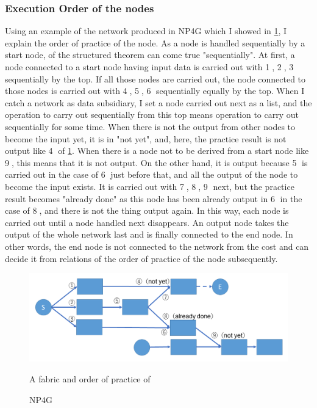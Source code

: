 \documentclass{article}
\begin{document}
\subsubsection {Execution Order of the nodes}
\label{sec:sequence}
Using an example of the network produced in NP4G which I showed in \ref{fig:sequence}, I explain the order of practice of the node.
As a node is handled sequentially by a start node, of the structured theorem can come true "sequentially".
At first, a node connected to a start node having input data is carried out with \textcircled{\scriptsize 1}, \textcircled{\scriptsize 2}, \textcircled{\scriptsize 3} sequentially by the top.
If all those nodes are carried out, the node connected to those nodes is carried out with \textcircled{\scriptsize 4}, \textcircled{\scriptsize 5}, \textcircled{\scriptsize 6} sequentially equally by the top.
When I catch a network as data subsidiary, I set a node carried out next as a list, and the operation to carry out sequentially from this top means operation to carry out sequentially for some time.
When there is not the output from other nodes to become the input yet, it is in "not yet", and, here, the practice result is not output like \textcircled{\scriptsize 4} of \ref{fig:sequence}.
When there is a node not to be derived from a start node like \textcircled{\scriptsize 9}, this means that it is not output.
On the other hand, it is output because \textcircled{\scriptsize 5} is carried out in the case of \textcircled{\scriptsize 6} just before that, and all the output of the node to become the input exists.
It is carried out with \textcircled{\scriptsize 7}, \textcircled{\scriptsize 8}, \textcircled{\scriptsize 9} next, but the practice result becomes "already done" as this node has been already output in \textcircled{\scriptsize 6} in the case of \textcircled{\scriptsize 8}, and there is not the thing output again.
In this way, each node is carried out until a node handled next disappears.
An output node takes the output of the whole network last and is finally connected to the end node.
In other words, the end node is not connected to the network from the cost and can decide it from relations of the order of practice of the node subsequently.
\begin{figure}[t]
\begin{center}
\includegraphics[width=130mm]{sequence.png}
\end{center}
A fabric and order of practice of \caption{NP4G}
\label{fig:sequence}
\end{figure}
\end{document}
